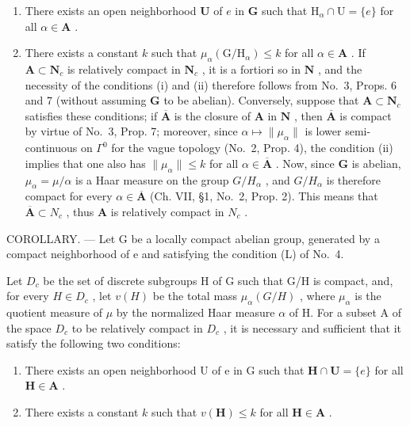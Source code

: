 \begin{enumerate}
\def\labelenumi{(\roman{enumi})}
\item
  There exists an open neighborhood \(\mathbf{U}\) of \(e\) in \(\mathbf{G}\) such that \(\mathrm{H}_{\alpha} \cap \mathrm{U} = \{e\}\) for all \(\alpha \in \mathbf{A}\) .
\item
  There exists a constant \(k\) such that \(\mu_{\alpha}(\mathrm{G} / \mathrm{H}_{\alpha}) \leqslant k\) for all \(\alpha \in \mathbf{A}\) . If \(\mathbf{A} \subset \mathbf{N}_c\) is relatively compact in \(\mathbf{N}_c\) , it is a fortiori so in \(\mathbf{N}\) , and the necessity of the conditions (i) and (ii) therefore follows from No.~3, Props. 6 and 7 (without assuming \(\mathbf{G}\) to be abelian). Conversely, suppose that \(\mathbf{A} \subset \mathbf{N}_c\) satisfies these conditions; if \(\overline{\mathbf{A}}\) is the closure of \(\mathbf{A}\) in \(\mathbf{N}\) , then \(\overline{\mathbf{A}}\) is compact by virtue of No.~3, Prop. 7; moreover, since \(\alpha \mapsto \| \mu_{\alpha} \|\) is lower semi-continuous on \(\Gamma^0\) for the vague topology (No.~2, Prop. 4), the condition (ii) implies that one also has \(\| \mu_{\alpha} \| \leqslant k\) for all \(\alpha \in \overline{\mathbf{A}}\) . Now, since \(\mathbf{G}\) is abelian, \(\mu_{\alpha} = \mu / \alpha\) is a Haar measure on the group \(G / H_{\alpha}\) , and \(G / H_{\alpha}\) is therefore compact for every \(\alpha \in \overline{\mathbf{A}}\) (Ch. VII, §1, No.~2, Prop. 2). This means that \(\overline{\mathbf{A}} \subset N_c\) , thus \(\mathbf{A}\) is relatively compact in \(N_c\) .
\end{enumerate}

COROLLARY. --- Let G be a locally compact abelian group, generated by a compact neighborhood of e and satisfying the condition (L) of No.~4.

Let \(D_c\) be the set of discrete subgroups H of G such that G/H is compact, and, for every \(H \in D_c\) , let \(v(H)\) be the total mass \(\mu_\alpha(G/H)\) , where \(\mu_\alpha\) is the quotient measure of \(\mu\) by the normalized Haar measure \(\alpha\) of H. For a subset A of the space \(D_c\) to be relatively compact in \(D_c\) , it is necessary and sufficient that it satisfy the following two conditions:

\begin{enumerate}
\def\labelenumi{(\roman{enumi})}
\item
  There exists an open neighborhood U of e in G such that \(\mathbf{H} \cap \mathbf{U} = \{e\}\) for all \(\mathbf{H} \in \mathbf{A}\) .
\item
  There exists a constant \(k\) such that \(v(\mathbf{H}) \leqslant k\) for all \(\mathbf{H} \in \mathbf{A}\) .
\end{enumerate}

